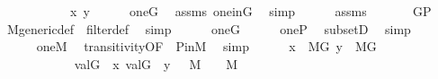 \begin{isabellebody}
%
\isadelimproof
%
\endisadelimproof
%
\isatagproof
{}\isamarkupfalse%
\ {\isacharminus}{\kern0pt}\ \isanewline
\ \ \isacommand{{\isacharbraceleft}{\kern0pt}}\isamarkupfalse%
\isanewline
\ \ \ \ \isamarkupfalse%
\ x\ y\isanewline
\ \ \ \ \isamarkupfalse%
\ {\isachardoublequoteopen}one{\isasymin}G{\isachardoublequoteclose}\ \isamarkupfalse%
\ assms\ one{\isacharunderscore}{\kern0pt}in{\isacharunderscore}{\kern0pt}G\ \isamarkupfalse%
\ simp\isanewline
\ \ \ \ \isamarkupfalse%
\ assms\ \isanewline
\ \ \ \ \isamarkupfalse%
\ {\isachardoublequoteopen}G{\isasymsubseteq}P{\isachardoublequoteclose}\ \isamarkupfalse%
\ M{\isacharunderscore}{\kern0pt}generic{\isacharunderscore}{\kern0pt}def\ \ filter{\isacharunderscore}{\kern0pt}def\ \isamarkupfalse%
\ simp\isanewline
\ \ \ \ \isamarkupfalse%
\ {\isacartoucheopen}one{\isasymin}G{\isacartoucheclose}\isanewline
\ \ \ \ \isamarkupfalse%
\ {\isachardoublequoteopen}one{\isasymin}P{\isachardoublequoteclose}\ \isamarkupfalse%
\ subsetD\ \isamarkupfalse%
\ simp\isanewline
\ \ \ \ \isamarkupfalse%
\ \isanewline
\ \ \ \ \isamarkupfalse%
\ {\isachardoublequoteopen}one{\isasymin}M{\isachardoublequoteclose}\ \isamarkupfalse%
\ transitivity{\isacharbrackleft}{\kern0pt}OF\ {\isacharunderscore}{\kern0pt}\ P{\isacharunderscore}{\kern0pt}in{\isacharunderscore}{\kern0pt}M{\isacharbrackright}{\kern0pt}\ \isamarkupfalse%
\ simp\isanewline
\ \ \ \ \isamarkupfalse%
\ {\isachardoublequoteopen}x\ {\isasymin}\ M{\isacharbrackleft}{\kern0pt}G{\isacharbrackright}{\kern0pt}{\isachardoublequoteclose}\ {\isachardoublequoteopen}y\ {\isasymin}\ M{\isacharbrackleft}{\kern0pt}G{\isacharbrackright}{\kern0pt}{\isachardoublequoteclose}\isanewline
\ \ \ \ \isamarkupfalse%
\ \isanewline
\ \ \ \ \isamarkupfalse%
\ {\isasymtau}\ {\isasymrho}\ \isanewline
\ \ \ \ \ \ {}\ {\isacharcolon}{\kern0pt}\ {\isachardoublequoteopen}val{\isacharparenleft}{\kern0pt}G{\isacharcomma}{\kern0pt}{\isasymtau}{\isacharparenright}{\kern0pt}\ {\isacharequal}{\kern0pt}\ x{\isachardoublequoteclose}\ {\isachardoublequoteopen}val{\isacharparenleft}{\kern0pt}G{\isacharcomma}{\kern0pt}{\isasymrho}{\isacharparenright}{\kern0pt}\ {\isacharequal}{\kern0pt}\ y{\isachardoublequoteclose}\ {\isachardoublequoteopen}{\isasymrho}\ {\isasymin}\ M{\isachardoublequoteclose}\ \ {\isachardoublequoteopen}{\isasymtau}\ {\isasymin}\ M{\isachardoublequoteclose}\isanewline

\end{isabellebody}
